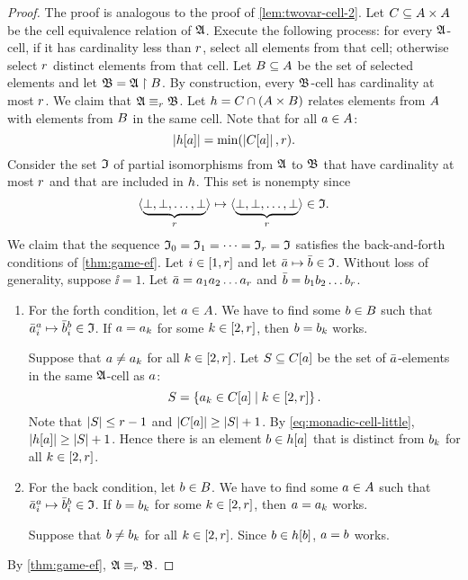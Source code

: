 \begin{proof}
The proof is analogous to the proof of \cref{lem:twovar-cell-2}.
Let $C \subseteq {A\times A}$ be the cell equivalence relation of $\mathfrak{A}$.
Execute the following process: for every $\mathfrak{A}$-cell, if it has cardinality
less than $r$, select all elements from that cell; otherwise select $r$
distinct elements from that cell.
Let $B \subseteq A$ be the set of selected elements and let
$\mathfrak{B} = \mathfrak{A} \restriction B$.
By construction, every $\mathfrak{B}$-cell has cardinality at most $r$.
We claim that $\mathfrak{A} \equiv_{r} \mathfrak{B}$.
Let $h = C \cap (A \times B)$ relates elements from $A$ with
elements from $B$ in the same cell.
Note that for all $a \in A$:
\begin{equation}\label{eq:monadic-cell-little}
  \left|h[a]\right| = \min(\left|C[a]\right|, r).
\end{equation}
Consider the set $\mathfrak{I}$ of partial isomorphisms from $\mathfrak{A}$ to $\mathfrak{B}$ that
have cardinality at most $r$ and that are included in $h$.
This set is nonempty since 
\[
  \langle \underbrace{\bot,\bot,\dots,\bot}_r \rangle \mapsto
  \langle \underbrace{\bot,\bot,\dots,\bot}_r \rangle \in \mathfrak{I}.
\]
We claim that the sequence $\mathfrak{I}_{0} = \mathfrak{I}_{1} = \dots = \mathfrak{I}_{r} = \mathfrak{I}$
satisfies the back-and-forth conditions of \cref{thm:game-ef}.
Let $i \in [1,r]$ and let $\bar{a} \mapsto \bar{b} \in \mathfrak{I}$.
Without loss of generality, suppose $\ii = 1$.
Let $\bar{a} = a_{1}a_{2}\dots a_{r}$ and $\bar{b} = b_{1}b_{2}\dots b_{r}$.
\begin{enumerate}
  \item For the forth condition, let $a \in A$.
  We have to find some $b \in B$ such that
  $\bar{a}_{i}^{a} \mapsto \bar{b}_{i}^{b} \in \mathfrak{I}$.
  If $a = a_{k}$ for some $k \in [2,r]$, then $b = b_{k}$ works.
  
  Suppose that $a \neq a_{k}$ for all $k \in [2,r]$.
  Let $S \subseteq C[a]$ be the set of $\bar{a}$-elements in the same
  $\mathfrak{A}$-cell as $a$:
  \[
    S = \left\{a_{k} \in C[a]\mathrel{}\middle|\mathrel{}k \in [2,r]\right\}.
  \]
  Note that $\left|S\right| \leq r-1$ and
  $\left|C[a]\right| \geq \left|S\right| + 1$.
  By \cref{eq:monadic-cell-little}, $\left|h[a]\right| \geq \left|S\right| + 1$.
  Hence there is an element $b \in h[a]$ that is distinct from
  $b_{k}$ for all $k \in [2,r]$.
  \item For the back condition, let $b \in B$.
  We have to find some $a \in A$ such that
  $\bar{a}_{i}^{a} \mapsto \bar{b}_{i}^{b} \in \mathfrak{I}$.
  If $b = b_{k}$ for some $k \in [2,r]$, then $a = a_{k}$ works.
  
  Suppose that $b \neq b_{k}$ for all $k \in [2,r]$. Since $b \in
  h[b]$, $a = b$ works.
\end{enumerate}
By \cref{thm:game-ef}, $\mathfrak{A} \equiv_{r} \mathfrak{B}$.
\end{proof}
